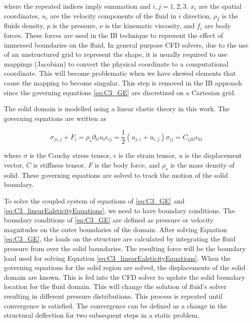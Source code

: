 where the repeated indices imply summation and $i,j=1,2,3$. $x_i$ are the spatial coordinates, $u_i$ are the velocity components of the fluid in $i$ direction, $\rho_f$ is the fluids density, $p$ is the pressure, $\nu$ is the kinematic viscosity, and $f_i$ are body forces. These forces are used in the IB technique to represent the effect of immersed boundaries on the fluid. In general purpose CFD solvers, due to the use of an unstructured grid to represent the shape, it is usually required to use mappings (Jacobian) to convert the physical coordinate to a computational coordinate. This will become problematic when we have skewed elements that cause the mapping to become singular. This step is removed in the IB approach since the governing equations \eqref{eq:C3_GE} are discretized on a Cartesian grid.

The solid domain is modelled using a linear elastic theory in this work. The governing equations are written as

\begin{subequations}\label{eq:C3_linearEalsticityEquations}
\begin{equation}
    \sigma_{ji,j} + F_i = \rho_s \partial_{tt} u_i
\end{equation}
\begin{equation}
    \epsilon_{ij} = \frac{1}{2} \left( u_{j,i} + u_{i,j} \right)
\end{equation}
\begin{equation}
    \sigma_{ij} = C_{ijkl} \epsilon_{kl}
\end{equation}
\end{subequations}

where $\sigma$ is the Cauchy stress tensor, $\epsilon$ is the strain tensor, $u$ is the displacement vector, $C$ is stiffness tensor, $F$ is the body force, and $\rho_s$ is the mass density of solid. These governing equations are solved to track the motion of the solid boundary. 

To solve the coupled system of equations of \eqref{eq:C3_GE} and \eqref{eq:C3_linearEalsticityEquations}, we need to have boundary conditions. The boundary conditions of \eqref{eq:C3_GE} are defined as pressure or velocity magnitudes on the outer boundaries of the domain. After solving Equation \eqref{eq:C3_GE}, the loads on the structure are calculated by integrating the fluid pressure from over the solid boundaries. The resulting force will be the boundary load used for solving Equation \eqref{eq:C3_linearEalsticityEquations}. When the governing equations for the solid region are solved, the displacements of the solid domain are known. This is fed into the CFD solver to update the solid boundary location for the fluid domain. This will change the solution of fluid's solver resulting in different pressure distributions. This process is repeated until convergence is satisfied. The convergence can be defined as a change in the structural deflection for two subsequent steps in a static problem.

